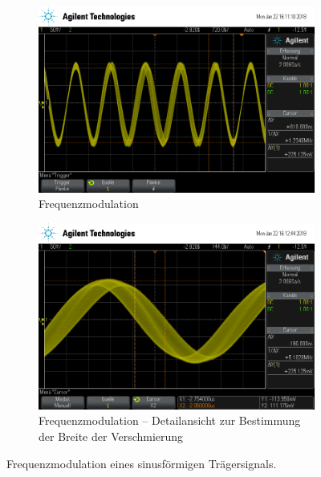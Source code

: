 \begin{figure}[t!]
	\centering
	\begin{subfigure}[t]{0.48\textwidth}
		\centering
		\includegraphics[width=\textwidth]{img/d_scope_233.png}
		\caption{Frequenzmodulation}
	\end{subfigure}\hfill%
	\begin{subfigure}[t]{0.48\textwidth}
		\centering
		\includegraphics[width=\textwidth]{img/d_scope_234.png}
		\caption{Frequenzmodulation -- Detailansicht zur Bestimmung der Breite der Verschmierung}
	\end{subfigure}
	\caption{Frequenzmodulation eines sinusförmigen Trägersignals.}
	\label{d1}
\end{figure}

